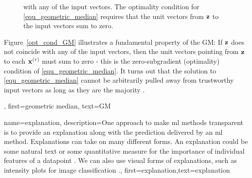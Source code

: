 {{\begin{figure}[H]
\begin{center}
{					with any of the input vectors. The optimality condition for \eqref{equ_geometric_median} 
					requires that the unit vectors from ${\bf z}$ to the input vectors sum to zero.}
			\end{center}
		\end{figure}
		Figure~\ref{opt_cond_GM} illustrates a fundamental property of the GM:
		If ${\bf z}$ does not coincide with any of the input vectors, then the unit vectors pointing 
		from ${\bf z}$ to each ${\bf x}^{(r)}$ must sum to zero - this is the zero-\gls{subgradient}  
		(optimality) condition of \eqref{equ_geometric_median}. It turns out that the solution to 
		\eqref{equ_geometric_median} cannot be arbitrarily pulled away from trustworthy input vectors as long as they 
		are the majority \cite[Th. 2.2]{Lopuhaae1991}.},
	first={geometric median},
	text={GM}
}

{name={explanation},
	description={One approach to make \gls{ml} methods transparent is to provide an 
		explanation along with the \gls{prediction} delivered by an 
		\gls{ml} method. Explanations can take on many different forms. An explanation 
		could be some natural text or some quantitative measure for the importance 
		of individual \gls{feature}s of a \gls{datapoint} \cite{Molnar2019}. We can also 
		use visual forms of explanations, such as intensity plots for image \gls{classification} \cite{GradCamPaper}.},
	first={explanation},text={explanation} 
}

